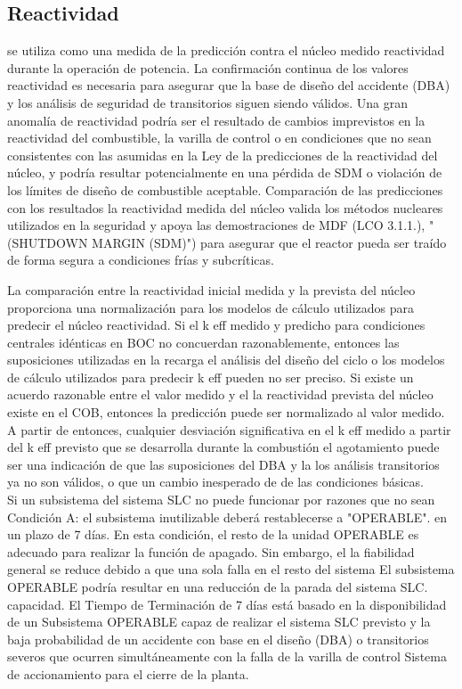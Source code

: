 \documentclass[]{article}
\begin{document}
\subsection{Reactividad}
se utiliza como una medida de la predicción contra el núcleo medido
reactividad durante la operación de potencia. La confirmación continua de los valores
reactividad es necesaria para asegurar que la base de diseño del accidente (DBA)
y los análisis de seguridad de transitorios siguen siendo válidos. Una gran anomalía de reactividad
podría ser el resultado de cambios imprevistos en la reactividad del combustible, la varilla de control
o en condiciones que no sean consistentes con las asumidas en la Ley de la
predicciones de la reactividad del núcleo, y podría resultar potencialmente en una pérdida de SDM
o violación de los límites de diseño de combustible aceptable. Comparación de las predicciones con los resultados
la reactividad medida del núcleo valida los métodos nucleares utilizados en la seguridad
y apoya las demostraciones de MDF (LCO 3.1.1.),
"(SHUTDOWN MARGIN (SDM)") para asegurar que el reactor pueda ser traído
de forma segura a condiciones frías y subcríticas.\\\citep{Regulation}


La comparación entre la reactividad inicial medida y la prevista del núcleo
proporciona una normalización para los modelos de cálculo utilizados para predecir el núcleo
reactividad. Si el k eff medido y predicho para condiciones centrales idénticas
en BOC no concuerdan razonablemente, entonces las suposiciones utilizadas en la recarga
el análisis del diseño del ciclo o los modelos de cálculo utilizados para predecir k eff pueden
no ser preciso. Si existe un acuerdo razonable entre el valor medido y el
la reactividad prevista del núcleo existe en el COB, entonces la predicción puede ser
normalizado al valor medido. A partir de entonces, cualquier desviación significativa
en el k eff medido a partir del k eff previsto que se desarrolla durante la combustión
el agotamiento puede ser una indicación de que las suposiciones del DBA y la
los análisis transitorios ya no son válidos, o que un cambio inesperado de
de las condiciones básicas.\citep{Regulation}\\


Si un subsistema del sistema SLC no puede funcionar por razones que no sean
Condición A: el subsistema inutilizable deberá restablecerse a "OPERABLE".
en un plazo de 7 días. En esta condición, el resto de la unidad OPERABLE
es adecuado para realizar la función de apagado. Sin embargo, el
la fiabilidad general se reduce debido a que una sola falla en el resto del sistema
El subsistema OPERABLE podría resultar en una reducción de la parada del sistema SLC.
capacidad. El Tiempo de Terminación de 7 días está basado en la disponibilidad de un
Subsistema OPERABLE capaz de realizar el sistema SLC previsto
y la baja probabilidad de un accidente con base en el diseño (DBA) o
transitorios severos que ocurren simultáneamente con la falla de la varilla de control
Sistema de accionamiento para el cierre de la planta.\citep{Regulation}\\
\end{document}
